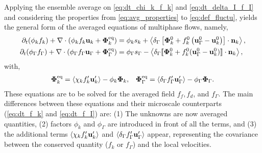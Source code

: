 Applying the ensemble average on \ref{eq:dt_chi_k_f_k} and \ref{eq:dt_delta_I_f_I} and considering the properties from \ref{eq:avg_properties} to \ref{eq:def_fluctu}, yields the general form of the averaged equations of multiphase flows, namely,
\begin{align}
    \pddt (\phi_k f_k)
    +\div (\phi_k f_k \textbf{u}_k + \mathbf{\Phi}_k^\text{eq})
    &= 
    \phi_k s_k
    + \avg{\delta_\Gamma\left[
        \mathbf{\Phi}_k^0
        + f_k^0
        \left(
            \textbf{u}_\Gamma^0
            - \textbf{u}_k^0
        \right)
    \right]
    \cdot \textbf{n}_k},
    \label{eq:avg_dt_chi_f}\\
    \pddt (\phi_\Gamma f_\Gamma)
    +\div (\phi_\Gamma f_\Gamma \textbf{u}_\Gamma+ \mathbf{\Phi}_\Gamma^\text{eq})
    &= 
    \phi_\Gamma s_\Gamma
    - \avg{\delta_\Gamma 
    \Jump{
    \mathbf{\Phi}_k^0
    + f_k^0 (\textbf{u}_\Gamma^0 - \textbf{u}_k^0)
    } 
     },
    \label{eq:avg_dt_delta_f}
\end{align}
with, 
\begin{align}
    \mathbf{\Phi}_k^\text{eq}
    = \left<\chi_k f_k' \textbf{u}_k'\right>
    - \phi_k \bm\Phi_k,
    &&
    \mathbf{\Phi}_\Gamma^\text{eq}
    = \left<\delta_\Gamma f_\Gamma' \textbf{u}_\Gamma'\right>
    - \phi_\Gamma \bm\Phi_\Gamma. 
\end{align}
These equations are to be solved for the averaged field $f_f,f_d$, and $f_\Gamma$.
The main differences between these equations and their microscale counterparts (\ref{eq:dt_f_k} and \ref{eq:dt_f_I}) are:
(1) The unknowns are now averaged quantities,
(2) factors $\phi_k$ and $\phi_\Gamma$ are introduced in front of all the terms, and
(3) the additional terms $\left<\chi_k f_k' \textbf{u}_k'\right>$ and $\left<\delta_\Gamma f_\Gamma' \textbf{u}_\Gamma'\right>$ appear, representing the covariance between the conserved quantity ($f_k$ or $f_\Gamma$) and the local velocities.  


